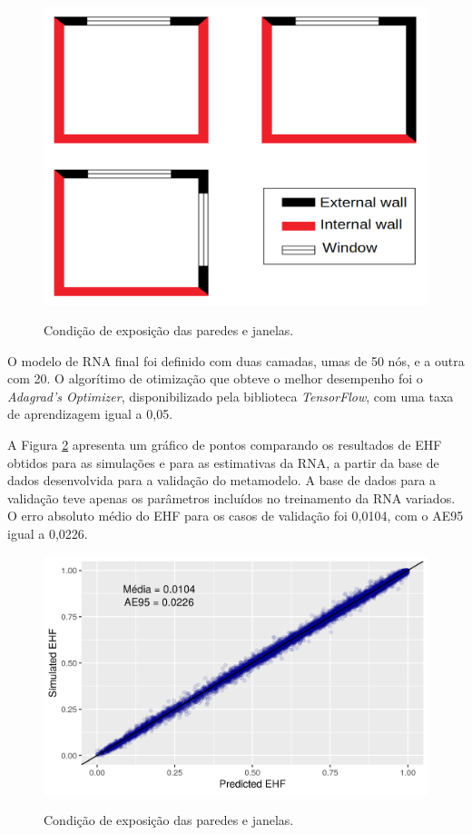 \documentclass[brazil,hardcopy,openany,a4paper]{ufscthesis}
\begin{document}
	\begin{figure}[H]
		\centering
		\caption{Condição de exposição das paredes e janelas.}
		\includegraphics[width=1\linewidth]{img/wallexposition.png}
		\label{fig:exp_sz}
	\end{figure}
	
	O modelo de RNA final foi definido com duas camadas, umas de 50 nós, e a outra com 20. 
	O algorítimo de otimização que obteve o melhor desempenho foi o \textit{Adagrad's Optimizer}, disponibilizado pela biblioteca \textit{TensorFlow}, com uma taxa de aprendizagem igual a 0,05.
	
	A Figura \ref{fig:ann_validation} apresenta um gráfico de pontos comparando os resultados de EHF obtidos para as simulações e para as estimativas da RNA, a partir da base de dados desenvolvida para a validação do metamodelo. A base de dados para a validação teve apenas os parâmetros incluídos no treinamento da RNA variados. 
	O erro absoluto médio do EHF para os casos de validação foi 0,0104, com o AE95 igual a 0,0226.
	
	\begin{figure}[H]
		\centering
		\caption{Condição de exposição das paredes e janelas.}
		\includegraphics[width=1\linewidth]{img/ann_validation.png}
		\label{fig:ann_validation}
	\end{figure}
	
\end{document}

